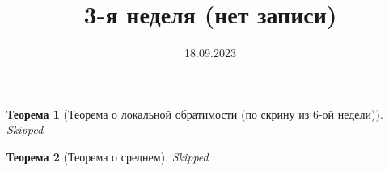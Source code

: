 \documentclass[11pt,a4paper,oneside]{scrartcl}
\title{3-я неделя (нет записи)}
\date{18.09.2023}
\newtheorem{theorem}{Теорема}
\begin{document}
\pagestyle{empty}

\maketitle

\begin{theorem}[Теорема о локальной обратимости (по скрину из 6-ой недели)]
    Skipped
\end{theorem}

\begin{theorem}[Теорема о среднем]
    Skipped
\end{theorem}
\end{document}
